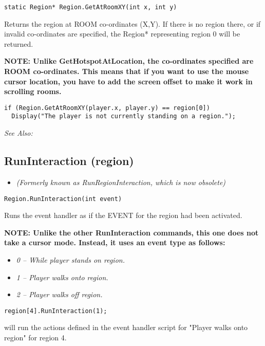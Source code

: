\begin{verbatim}
static Region* Region.GetAtRoomXY(int x, int y)
\end{verbatim}
Returns the region at ROOM co-ordinates (X,Y).
If there is no region there, or if invalid co-ordinates are specified,
the Region* representing region 0 will be returned.

\bf{NOTE:} Unlike GetHotspotAtLocation, the co-ordinates specified are ROOM co-ordinates. This
means that if you want to use the mouse cursor location, you have to add the
screen offset to make it work in scrolling rooms.

\begin{verbatim}
if (Region.GetAtRoomXY(player.x, player.y) == region[0])
  Display("The player is not currently standing on a region.");
\end{verbatim}

\it{See Also:} 


\subsection{RunInteraction (region)}\label{Region.RunInteraction}%

\begin{itemize}
\item \it{(Formerly known as RunRegionInteraction, which is now obsolete)} 
\end{itemize}

\begin{verbatim}
Region.RunInteraction(int event)
\end{verbatim}
Runs the event handler as if the EVENT for the region had been activated.

\bf{NOTE:} Unlike the other RunInteraction commands, this one does not take a cursor mode.
Instead, it uses an event type as follows:
\begin{itemize}
\item \it{0} -- While player stands on region.
\item \it{1} -- Player walks onto region.
\item \it{2} -- Player walks off region.
\end{itemize}

\begin{verbatim}
region[4].RunInteraction(1);
\end{verbatim}
will run the actions defined in the event handler script for "Player walks onto region"
for region 4.

